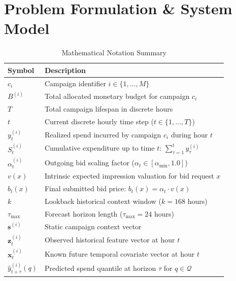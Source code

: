 \documentclass[sigconf]{acmart}
\begin{document}
\section{Problem Formulation \& System Model}

\begin{table}[t]
\centering
\caption{Mathematical Notation Summary}
\label{tab:notation}
\small
\begin{tabular}{ll}
\toprule
\textbf{Symbol} & \textbf{Description} \\
\midrule
$c_i$ & Campaign identifier $i \in \{1, \dots, M\}$ \\
$B^{(i)}$ & Total allocated monetary budget for campaign $c_i$ \\
$T$ & Total campaign lifespan in discrete hours \\
$t$ & Current discrete hourly time step ($t \in \{1, \dots, T\}$) \\
$y_t^{(i)}$ & Realized spend incurred by campaign $c_i$ during hour $t$ \\
$S_t^{(i)}$ & Cumulative expenditure up to time $t$: $\sum_{\tau=1}^t y_\tau^{(i)}$ \\
$\alpha_t^{(i)}$ & Outgoing bid scaling factor ($\alpha_t \in [\alpha_{\min}, 1.0]$) \\
$v(x)$ & Intrinsic expected impression valuation for bid request $x$ \\
$b_t(x)$ & Final submitted bid price: $b_t(x) = \alpha_t \cdot v(x)$ \\
$k$ & Lookback historical context window ($k = 168$ hours) \\
$\tau_{\max}$ & Forecast horizon length ($\tau_{\max} = 24$ hours) \\
$\mathbf{s}^{(i)}$ & Static campaign context vector \\
$\mathbf{z}_t^{(i)}$ & Observed historical feature vector at hour $t$ \\
$\mathbf{x}_t^{(i)}$ & Known future temporal covariate vector at hour $t$ \\
$\hat{y}_{t+\tau}^{(i)}(q)$ & Predicted spend quantile at horizon $\tau$ for $q \in \mathcal{Q}$ \\
\bottomrule
\end{tabular}
\end{table}
\end{document}
